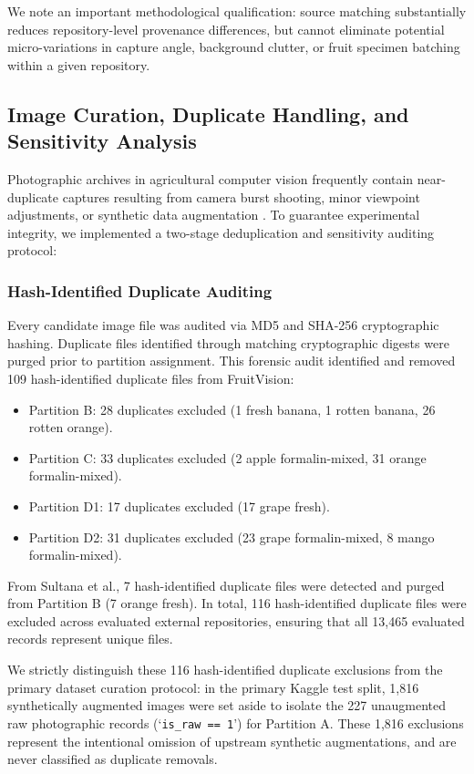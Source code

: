 We note an important methodological qualification: source matching substantially reduces repository-level provenance differences, but cannot eliminate potential micro-variations in capture angle, background clutter, or fruit specimen batching within a given repository.

\subsection{Image Curation, Duplicate Handling, and Sensitivity Analysis}
\label{sec:duplicate_handling_phash}

Photographic archives in agricultural computer vision frequently contain near-duplicate captures resulting from camera burst shooting, minor viewpoint adjustments, or synthetic data augmentation \cite{abayomi2024fruitq,sultana2022extensive}. To guarantee experimental integrity, we implemented a two-stage deduplication and sensitivity auditing protocol:

\subsubsection{Hash-Identified Duplicate Auditing}
Every candidate image file was audited via MD5 and SHA-256 cryptographic hashing. Duplicate files identified through matching cryptographic digests were purged prior to partition assignment. This forensic audit identified and removed 109 hash-identified duplicate files from FruitVision:
\begin{itemize}
\item Partition B: 28 duplicates excluded (1 fresh banana, 1 rotten banana, 26 rotten orange).
\item Partition C: 33 duplicates excluded (2 apple formalin-mixed, 31 orange formalin-mixed).
\item Partition D1: 17 duplicates excluded (17 grape fresh).
\item Partition D2: 31 duplicates excluded (23 grape formalin-mixed, 8 mango formalin-mixed).
\end{itemize}
From Sultana et al., 7 hash-identified duplicate files were detected and purged from Partition B (7 orange fresh). In total, 116 hash-identified duplicate files were excluded across evaluated external repositories, ensuring that all 13,465 evaluated records represent unique files.

We strictly distinguish these 116 hash-identified duplicate exclusions from the primary dataset curation protocol: in the primary Kaggle test split, 1,816 synthetically augmented images were set aside to isolate the 227 unaugmented raw photographic records (`\texttt{is\_raw == 1}') for Partition A. These 1,816 exclusions represent the intentional omission of upstream synthetic augmentations, and are never classified as duplicate removals.

